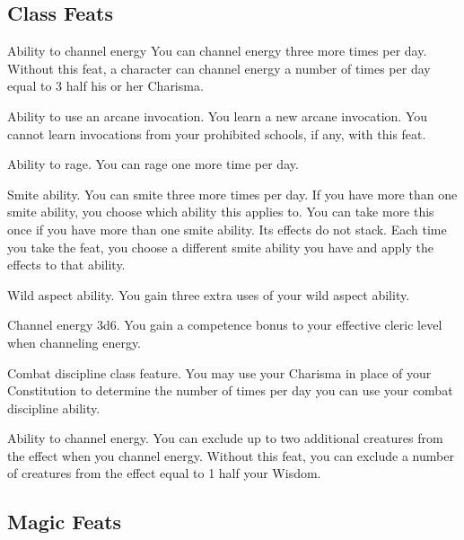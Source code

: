 \subsection{Class Feats}

 Ability to channel energy
 You can channel energy three more times per day. 
 Without this feat, a character can channel energy a number of times per day equal to 3 \add half his or her Charisma.

 Ability to use an arcane invocation.
 You learn a new arcane invocation. You cannot learn invocations from your prohibited schools, if any, with this feat.

 Ability to rage.
 You can rage one more time per day.

 Smite ability.
 You can smite three more times per day. If you have more than one smite ability, you choose which ability this applies to.
 You can take more this once if you have more than one smite ability. Its effects do not stack. Each time you take the feat, you choose a different smite ability you have and apply the effects to that ability.

 Wild aspect ability.
 You gain three extra uses of your wild aspect ability.

 Channel energy 3d6.
 You gain a  competence bonus to your effective cleric level when channeling energy.

\featpre Combat discipline class feature.
\featben You may use your Charisma in place of your Constitution to determine the number of times per day you can use your combat discipline ability. 

 Ability to channel energy.
 You can exclude up to two additional creatures from the effect when you channel energy.
 Without this feat, you can exclude a number of creatures from the effect equal to 1 \add half your Wisdom.

\subsection{Magic Feats}

